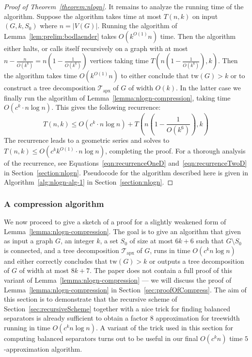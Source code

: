 \documentclass[a4paper,11pt]{article}
\theoremstyle{definition}
\theoremstyle{remark}
\newcommand{\td}{\mathcal{T}} \newcommand{\tw}{\mathrm{tw}} \newcommand{\w}{\mathrm{w}}
\newcommand{\apx}{\textrm{apx}}
\begin{document}
\begin{proof}[Proof of Theorem~\ref{theorem:nlogn}]
  It remains to analyze the running time of the algorithm.  Suppose
  the algorithm takes time at most $T(n,k)$ on input $(G,k,S_0)$ where
  $n = |V(G)|$.  Running the algorithm of
  Lemma~\ref{lem:prelim:bodlaender} takes $O(k^{O(1)}n)$ time.  Then
  the algorithm either halts, or calls itself recursively on a graph
  with at most $n-\frac{n}{O(k^6)} = n(1-\frac{1}{O(k^6)})$ vertices
  taking time $T(n(1-\frac{1}{O(k^6)}), k)$.  Then the algorithm takes
  time $O(k^{O(1)}n)$ to either conclude that $\tw(G)>k$ or to
  construct a tree decomposition $\td_\apx$ of $G$ of width $O(k)$.
  In the latter case we finally run the algorithm of
  Lemma~\ref{lemma:nlogn-compression}, taking time $O(c^k\cdot n \log
  n)$.  This gives the following recurrence:
  \[
  T(n,k) \leq O\left(c^k\cdot n \log n\right) + T\left(n
    \left(1-\frac{1}{O(k^6)} \right), k \right)
  \]
  The recurrence leads to a geometric series and solves to $T(n,k)
  \leq O(c^kk^{O(1)}\cdot n \log n)$, completing the proof.  For a
  thorough analysis of the recurrence, see
  Equations~\ref{eqn:recurrenceOneD} and~\ref{eqn:recurrenceTwoD} in
  Section~\ref{section:nlogn}.  Pseudocode for the algorithm described
  here is given in Algorithm~\ref{alg:nlogn-alg-1} in
  Section~\ref{section:nlogn}.
\end{proof}

\subsubsection{A compression algorithm}\label{sec:firstCompress}
We now proceed to give a sketch of a proof for a slightly weakened
form of Lemma~\ref{lemma:nlogn-compression}.  The goal is to give an
algorithm that given as input a graph $G$, an integer $k$, a set $S_0$
of size at most $6k+6$ such that $G\setminus S_0$ is connected, and a
tree decomposition $\td_\apx$ of $G$, runs in time $O(c^kn \log n)$
and either correctly concludes that $\tw(G) > k$ or outputs a tree
decomposition of $G$ of width at most $8k+7$.  The paper does not
contain a full proof of this variant of
Lemma~\ref{lemma:nlogn-compression} --- we will discuss the proof of
Lemma~\ref{lemma:nlogn-compression} in
Section~\ref{sec:proofOfCompress}.  The aim of this section is to
demonstrate that the recursive scheme of
Section~\ref{sec:recursiveScheme} together with a nice trick for
finding balanced separators is already sufficient to obtain a factor
$8$ approximation for treewidth running in time $O(c^k n\log n)$.  A
variant of the trick used in this section for computing balanced
separators turns out to be useful in our final $O(c^kn)$ time
$5$-approximation algorithm.
\end{document}
